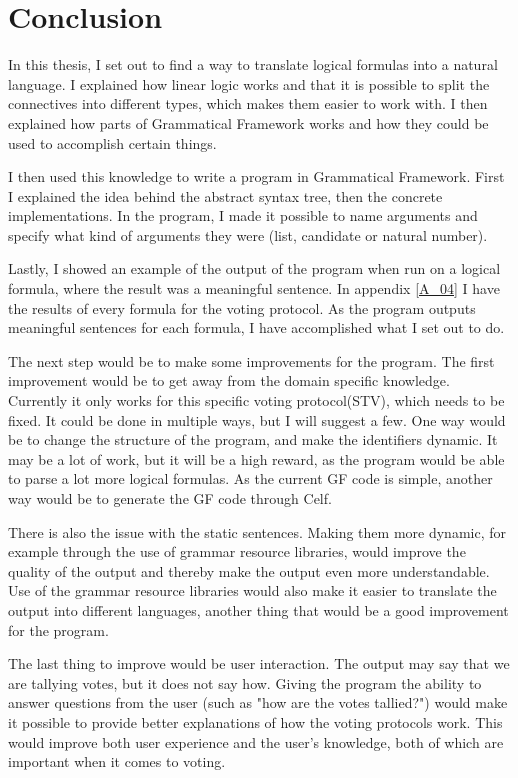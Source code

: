 \chapter{Conclusion}
\label{05}

In this thesis, I set out to find a way to translate logical formulas into a natural language. I explained how linear logic works and that it is possible to split the connectives into different types, which makes them easier to work with. I then explained how parts of Grammatical Framework works and how they could be used to accomplish certain things. 

I then used this knowledge to write a program in Grammatical Framework. First I explained the idea behind the abstract syntax tree, then the concrete implementations. In the program, I made it possible to name arguments and specify what kind of arguments they were (list, candidate or natural number). 

Lastly, I showed an example of the output of the program when run on a logical formula, where the result was a meaningful sentence. In appendix \ref{A_04} I have the results of every formula for the voting protocol. As the program outputs meaningful sentences for each formula, I have accomplished what I set out to do.

The next step would be to make some improvements for the program. The first improvement would be to get away from the domain specific knowledge. Currently it only works for this specific voting protocol(STV), which needs to be fixed. It could be done in multiple ways, but I will suggest a few. One way would be to change the structure of the program, and make the identifiers dynamic. It may be a lot of work, but it will be a high reward, as the program would be able to parse a lot more logical formulas. As the current GF code is simple, another way would be to generate the GF code through Celf.

There is also the issue with the static sentences. Making them more dynamic, for example through the use of grammar resource libraries, would improve the quality of the output and thereby make the output even more understandable. Use of the grammar resource libraries would also make it easier to translate the output into different languages, another thing that would be a good improvement for the program.

The last thing to improve would be user interaction. The output may say that we are tallying votes, but it does not say how. Giving the program the ability to answer questions from the user (such as "how are the votes tallied?") would make it possible to provide better explanations of how the voting protocols work. This would improve both user experience and the user's knowledge, both of which are important when it comes to voting.